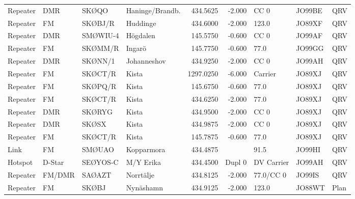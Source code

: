 \begin{landscape}
\begin{longtable}{llllrrlll}
	Repeater          & DMR                & SKØQO    & Haninge/Brandb. &     434.5625 &     -2.000 & CC 0       & JO99BE      & QRV      \\
	Repeater          & FM                 & SKØBJ/R  & Huddinge        &     434.6000 &     -2.000 & 123.0      & JO89XF      & QRV      \\
	Repeater          & DMR                & SMØWIU-4 & Högdalen        &     145.5750 &     -0.600 & CC 0       & JO99AF      & QRV      \\
	Repeater          & FM                 & SKØMM/R  & Ingarö          &     145.7750 &     -0.600 & 77.0       & JO99GG      & QRV      \\
	Repeater          & DMR                & SKØNN/1  & Johanneshov     &     434.9250 &     -2.000 & CC 0       & JO99AH      & QRV      \\
	Repeater          & FM                 & SKØCT/R  & Kista           &    1297.0250 &     -6.000 & Carrier    & JO89XJ      & QRV      \\
	Repeater          & FM                 & SKØPQ/R  & Kista           &     145.6750 &     -0.600 & 77.0       & JO89XJ      & QRV      \\
	Repeater          & FM                 & SKØCT/R  & Kista           &     434.6250 &     -2.000 & 77.0       & JO89XJ      & QRV      \\
	Repeater          & DMR                & SKØRYG   & Kista           &     434.9500 &     -2.000 & CC 0       & JO89XJ      & QRV      \\
	Repeater          & DMR                & SKØSX    & Kista           &     434.9875 &     -2.000 & CC 0       & JO89XJ      & QRV      \\
	Repeater          & FM                 & SKØCT/R  & Kista           &     145.7875 &     -0.600 & 77.0       & JO89XJ      & QRV      \\
	Link              & FM                 & SMØUAO   & Kopparmora      &     434.4875 &            & 91.5       & JO99HI      & QRV      \\
	Hotspot           & D-Star             & SEØYOS-C & M/Y Erika       &     434.4500 &     Dupl 0 & DV Carrier & JO99AH      & QRV      \\
	Repeater          & FM/DMR             & SAØAZT   & Norrtälje       &     434.8125 &     -2.000 & 77.0/CC 0  & JO99IS      & QRV      \\
	Repeater          & FM                 & SKØBJ    & Nynäshamn       &     434.9125 &     -2.000 & 123.0      & JO88WT      & Plan     \\

\end{longtable}
\end{landscape}
